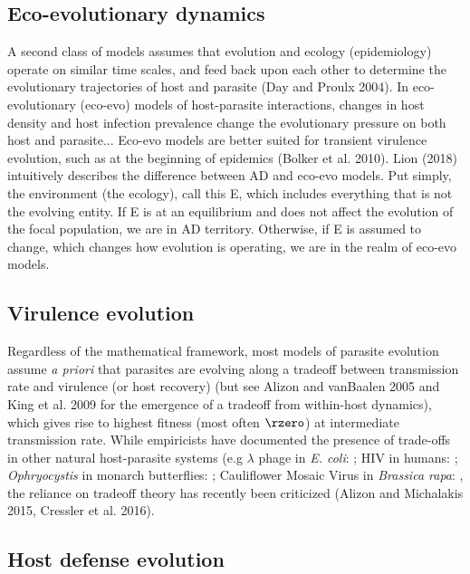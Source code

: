 \subsection*{Eco-evolutionary dynamics}

A second class of models assumes that evolution and ecology (epidemiology) operate on similar time scales, and feed back upon each other to determine the evolutionary trajectories of host and parasite (Day and Proulx 2004). In eco-evolutionary (eco-evo) models of host-parasite interactions, changes in host density and host infection prevalence change the evolutionary pressure on both host and parasite... Eco-evo models are better suited for transient virulence evolution, such as at the beginning of epidemics (Bolker et al. 2010). Lion (2018) intuitively describes the difference between AD and eco-evo models. Put simply, the environment (the ecology), call this E, which includes everything that is not the evolving entity. If E is at an equilibrium and does not affect the evolution of the focal population, we are in AD territory. Otherwise, if E is assumed to change, which changes how evolution is operating, we are in the realm of eco-evo models. 

\subsection*{Virulence evolution}

Regardless of the mathematical framework, most models of parasite evolution assume \emph{a priori} that parasites are evolving along a tradeoff between transmission rate and virulence (or host recovery) (but see Alizon and vanBaalen 2005 and King et al. 2009 for the emergence of a tradeoff from within-host dynamics), which gives rise to highest fitness (most often $\rzero$) at intermediate transmission rate. While empiricists have documented the presence of trade-offs in other natural host-parasite systems (e.g $\lambda$ phage in \textit{E. coli}: \citealt{Berngruberetal.2015}; HIV in humans: \citealt{Fraseretal.2007}; \textit{Ophryocystis} in monarch butterflies: \citealt{DeRoodeetal.2008}; Cauliflower Mosaic Virus in \textit{Brassica rapa}: \citealt{Doumayrouetal.2013}, the reliance on tradeoff theory has recently been criticized (Alizon and Michalakis 2015, Cressler et al. 2016). 

\subsection*{Host defense evolution}

